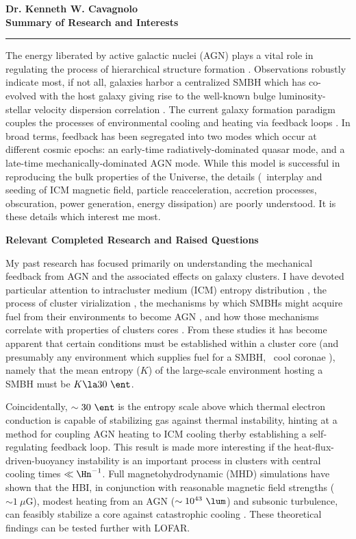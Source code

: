 \documentclass[12pt]{article}
\begin{document}
\begin{center}
{\large \textbf{Dr. Kenneth W. Cavagnolo\\Summary of Research and Interests}}
\rule{17cm}{2pt}
\end{center}
\normalsize

The energy liberated by active galactic nuclei (AGN) plays a vital
role in regulating the process of hierarchical structure formation
\cite[\eg][]{perseus1, croton06, bower06, saro06, sijacki07,
birzan08}. Observations robustly indicate most, if not all, galaxies
harbor a centralized SMBH which has co-evolved with the host galaxy
giving rise to the well-known bulge luminosity-stellar velocity
dispersion correlation \cite{1995ARA&A..33..581K, magorrian}. The
current galaxy formation paradigm couples the processes of
environmental cooling and heating via feedback loops
\cite{2002MNRAS.333..145N, mcnamrev}. In broad terms, feedback has
been segregated into two modes which occur at different cosmic epochs:
an early-time radiatively-dominated quasar mode, and a late-time
mechanically-dominated AGN mode. While this model is successful in
reproducing the bulk properties of the Universe, the details (\ie\
interplay and seeding of ICM magnetic field, particle reacceleration,
accretion processes, obscuration, power generation, energy
dissipation) are poorly understood. It is these details which interest
me most.

{\bf{Relevant Completed Research and Raised Questions}}

My past research has focused primarily on understanding the mechanical
feedback from AGN and the associated effects on galaxy clusters. I
have devoted particular attention to intracluster medium (ICM) entropy
distribution \cite{accept}, the process of cluster virialization
\cite{xrayband}, the mechanisms by which SMBHs might acquire fuel from
their environments to become AGN \cite{conduction}, and how those
mechanisms correlate with properties of clusters cores
\cite{haradent}. From these studies it has become apparent that
certain conditions must be established within a cluster core (and
presumably any environment which supplies fuel for a SMBH, \eg\ cool
coronae \cite{coronae}), namely that the mean entropy ($K$) of the
large-scale environment hosting a SMBH must be $K \la 30~\ent$.

Coincidentally, $\sim 30~\ent$ is the entropy scale above which
thermal electron conduction is capable of stabilizing gas against
thermal instability, hinting at a method for coupling AGN heating to
ICM cooling therby establishing a self-regulating feedback loop. This
result is made more interesting if the heat-flux-driven-buoyancy
instability \cite[HBI,][]{2008ApJ...677L...9P} is an important process
in clusters with central cooling times $\ll \Hn^{-1}$. Full
magnetohydrodynamic (MHD) simulations have shown that the HBI, in
conjunction with reasonable magnetic field strengths ($\sim 1~\mu$G),
modest heating from an AGN ($\sim 10^{43}~\lum$) and subsonic
turbulence, can feasibly stabilize a core against catastrophic cooling
\cite{2009ApJ...703...96P, 2009arXiv0911.5198R}. These theoretical
findings can be tested further with LOFAR.
\end{document}
